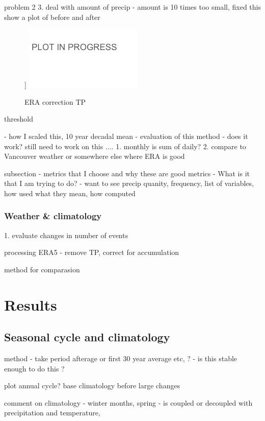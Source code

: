 \documentclass[draft]{agujournal2019}
\begin{document}
problem 2 3. deal with amount of precip - amount is 10 times too small, fixed this show a plot of before and after 

\begin{figure}[h!tbp]]
\noindent\includegraphics[width=0.5\textwidth]{figures/plot_in_progress.png}
\caption{ERA correction TP}
\end{figure}


threshold 

- how I scaled this, 10 year decadal mean 
- evaluation of this method - does it work?
still need to work on this ....
1. monthly is sum of daily?
2. compare to Vancouver weather or somewhere else where ERA is good


subsection
- metrics that I choose and why these are good metrics
- What is it that I am trying to do?
- want to see precip quanity, frequency, list of variables, how used what they mean, how computed

\subsubsection{Weather \& climatology}
1. evaluate changes in number of events 

processing ERA5
- remove TP, correct for accumulation

method for comparasion

\section{Results}

\subsection{Seasonal cycle and climatology}
method - take period afterage or first 30 year average etc, ? - is this stable enough to do this ?

plot annual cycle? base climatology before large changes

comment on climatology - winter months, spring - is coupled or decoupled with precipitation and temperature, 
\end{document}
